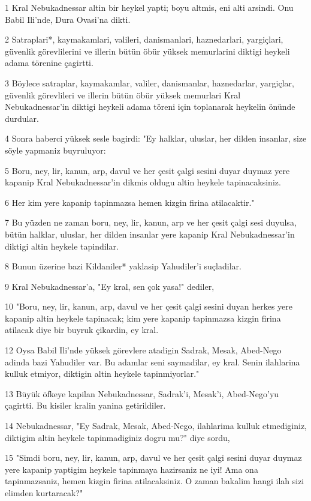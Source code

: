 \par 1 Kral Nebukadnessar altin bir heykel yapti; boyu altmis, eni alti arsindi. Onu Babil Ili'nde, Dura Ovasi'na dikti.
\par 2 Satraplari*, kaymakamlari, valileri, danismanlari, haznedarlari, yargiçlari, güvenlik görevlilerini ve illerin bütün öbür yüksek memurlarini diktigi heykeli adama törenine çagirtti.
\par 3 Böylece satraplar, kaymakamlar, valiler, danismanlar, haznedarlar, yargiçlar, güvenlik görevlileri ve illerin bütün öbür yüksek memurlari Kral Nebukadnessar'in diktigi heykeli adama töreni için toplanarak heykelin önünde durdular.
\par 4 Sonra haberci yüksek sesle bagirdi: "Ey halklar, uluslar, her dilden insanlar, size söyle yapmaniz buyruluyor:
\par 5 Boru, ney, lir, kanun, arp, davul ve her çesit çalgi sesini duyar duymaz yere kapanip Kral Nebukadnessar'in dikmis oldugu altin heykele tapinacaksiniz.
\par 6 Her kim yere kapanip tapinmazsa hemen kizgin firina atilacaktir."
\par 7 Bu yüzden ne zaman boru, ney, lir, kanun, arp ve her çesit çalgi sesi duyulsa, bütün halklar, uluslar, her dilden insanlar yere kapanip Kral Nebukadnessar'in diktigi altin heykele tapindilar.
\par 8 Bunun üzerine bazi Kildaniler* yaklasip Yahudiler'i suçladilar.
\par 9 Kral Nebukadnessar'a, "Ey kral, sen çok yasa!" dediler,
\par 10 "Boru, ney, lir, kanun, arp, davul ve her çesit çalgi sesini duyan herkes yere kapanip altin heykele tapinacak; kim yere kapanip tapinmazsa kizgin firina atilacak diye bir buyruk çikardin, ey kral.
\par 12 Oysa Babil Ili'nde yüksek görevlere atadigin Sadrak, Mesak, Abed-Nego adinda bazi Yahudiler var. Bu adamlar seni saymadilar, ey kral. Senin ilahlarina kulluk etmiyor, diktigin altin heykele tapinmiyorlar."
\par 13 Büyük öfkeye kapilan Nebukadnessar, Sadrak'i, Mesak'i, Abed-Nego'yu çagirtti. Bu kisiler kralin yanina getirildiler.
\par 14 Nebukadnessar, "Ey Sadrak, Mesak, Abed-Nego, ilahlarima kulluk etmediginiz, diktigim altin heykele tapinmadiginiz dogru mu?" diye sordu,
\par 15 "Simdi boru, ney, lir, kanun, arp, davul ve her çesit çalgi sesini duyar duymaz yere kapanip yaptigim heykele tapinmaya hazirsaniz ne iyi! Ama ona tapinmazsaniz, hemen kizgin firina atilacaksiniz. O zaman bakalim hangi ilah sizi elimden kurtaracak?"
